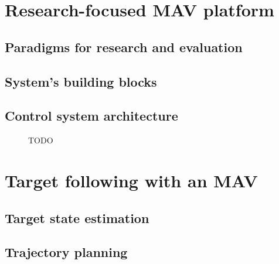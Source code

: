 \documentclass[a4paper,11pt,titlepage,twoside]{book}
\begin{document}


\chapter{Research-focused MAV platform}


\section{Paradigms for research and evaluation}

\section{System's building blocks}

\section{Control system architecture}

\begin{figure}
  
  \label{fig:mrs_platform_all}
  \caption{TODO}
\end{figure}



\chapter{Target following with an MAV}


\section{Target state estimation}

\section{Trajectory planning}
\end{document}
